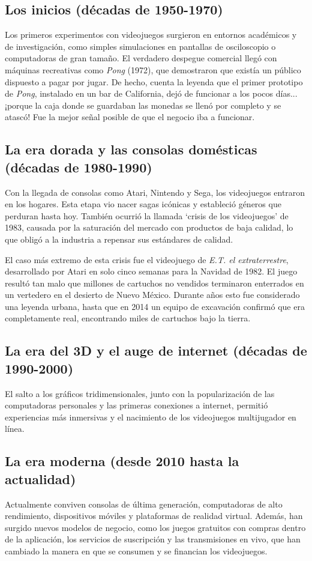 \documentclass[12pt]{report}
\begin{document}
\subsection*{Los inicios (décadas de 1950-1970)}
Los primeros experimentos con videojuegos surgieron en entornos académicos y de investigación, como simples simulaciones en pantallas de osciloscopio o computadoras de gran tamaño. El verdadero despegue comercial llegó con máquinas recreativas como \textit{Pong} (1972), que demostraron que existía un público dispuesto a pagar por jugar. De hecho, cuenta la leyenda que el primer prototipo de \textit{Pong}, instalado en un bar de California, dejó de funcionar a los pocos días... ¡porque la caja donde se guardaban las monedas se llenó por completo y se atascó! Fue la mejor señal posible de que el negocio iba a funcionar.

\subsection*{La era dorada y las consolas domésticas (décadas de 1980-1990)}
Con la llegada de consolas como Atari, Nintendo y Sega, los videojuegos entraron en los hogares. Esta etapa vio nacer sagas icónicas y estableció géneros que perduran hasta hoy. También ocurrió la llamada `crisis de los videojuegos' de 1983, causada por la saturación del mercado con productos de baja calidad, lo que obligó a la industria a repensar sus estándares de calidad.

El caso más extremo de esta crisis fue el videojuego de \textit{E.T. el extraterrestre}, desarrollado por Atari en solo cinco semanas para la Navidad de 1982. El juego resultó tan malo que millones de cartuchos no vendidos terminaron enterrados en un vertedero en el desierto de Nuevo México. Durante años esto fue considerado una leyenda urbana, hasta que en 2014 un equipo de excavación confirmó que era completamente real, encontrando miles de cartuchos bajo la tierra.

\subsection*{La era del 3D y el auge de internet (décadas de 1990-2000)}
El salto a los gráficos tridimensionales, junto con la popularización de las computadoras personales y las primeras conexiones a internet, permitió experiencias más inmersivas y el nacimiento de los videojuegos multijugador en línea.

\subsection*{La era moderna (desde 2010 hasta la actualidad)}
Actualmente conviven consolas de última generación, computadoras de alto rendimiento, dispositivos móviles y plataformas de realidad virtual. Además, han surgido nuevos modelos de negocio, como los juegos gratuitos con compras dentro de la aplicación, los servicios de suscripción y las transmisiones en vivo, que han cambiado la manera en que se consumen y se financian los videojuegos.
\end{document}
